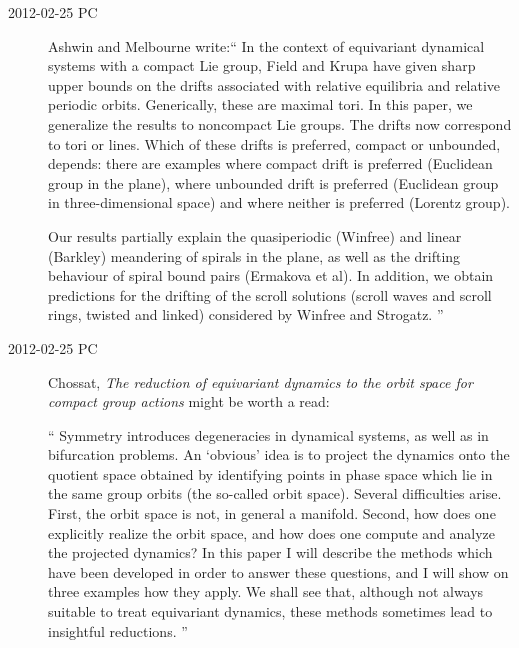 \begin{description}
\item[2012-02-25 PC]
Ashwin and Melbourne write:``
In the context of equivariant dynamical systems with a compact Lie group,
Field and Krupa have given sharp upper bounds on the
drifts associated with relative equilibria and relative periodic orbits.
Generically, these are maximal tori.
In this paper, we generalize the results to noncompact
Lie groups. The drifts now correspond to tori or lines. Which of these
drifts is preferred, compact or unbounded, depends: there are
examples where compact drift is preferred (Euclidean group in the plane),
where unbounded drift is preferred (Euclidean group in three-dimensional
space) and where neither is preferred (Lorentz group).

Our results partially explain the quasiperiodic (Winfree) and linear
(Barkley) meandering of spirals in the plane, as well as the drifting
behaviour of spiral bound pairs (Ermakova et al). In addition, we obtain
predictions for the drifting of the scroll solutions (scroll waves and
scroll rings, twisted and linked) considered by Winfree and Strogatz.
''

\item[2012-02-25 PC]
Chossat,
{\em The reduction of equivariant dynamics to the
        orbit space for compact group actions}
might be worth a read:

``
Symmetry introduces degeneracies in dynamical systems, as well as in
bifurcation problems. An `obvious' idea is to project the dynamics onto
the quotient space obtained by identifying points in phase space which
lie in the same group orbits (the so-called orbit space). Several
difficulties arise. First, the orbit space is not, in general a manifold.
Second, how does one explicitly realize the orbit space, and how does one
compute and analyze the projected dynamics? In this paper I will describe
the methods which have been developed in order to answer these questions,
and I will show on three examples how they apply. We shall see that,
although not always suitable to treat equivariant dynamics, these methods
sometimes lead to insightful reductions.
''

\end{description}



\renewcommand{\ssp}{a}
